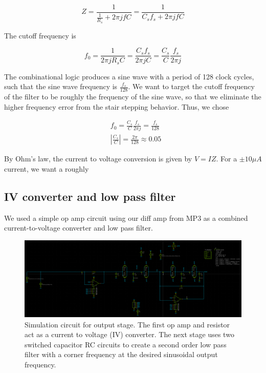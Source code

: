 \documentclass{article}
\begin{document}
\begin{equation}
    \label{eq:equivalent_impedance}
    Z = \frac{1}{\frac{1}{R_s} + 2 \pi j f C} = \frac{1}{C_s f_s + 2 \pi j f C}
\end{equation}

The cutoff frequency is 

\begin{equation}
    f_0 = \frac{1}{2 \pi j R_s C} = \frac{C_s f_s}{2 \pi j C} = \frac{C_s}{C} \frac{f_s}{2 \pi j}
\end{equation}

The combinational logic produces a sine wave with a period of 128 clock cycles, such that the sine wave frequency is $\frac{f_s}{128}$. We want to target the cutoff frequency of the filter to be roughly the frequency of the sine wave, so that we eliminate the higher frequency error from the stair stepping behavior. Thus, we chose

\begin{equation}
\begin{split}
    \label{eq:capacitor_speccing}
    & f_0 = \frac{C_s}{C} \frac{f_s}{2 \pi j} = \frac{f_s}{128} \\
    & |\frac{C_s}{C}| =\frac{2 \pi}{128} \approx 0.05
\end{split} 
\end{equation}

By Ohm's law, the current to voltage conversion is given by $V = IZ$. For a $\pm 10\mu A$ current, we want a roughly

\subsection{IV converter and low pass filter}
We used a simple op amp circuit using our diff amp from MP3 as a combined current-to-voltage converter and low pass filter. 


\begin{figure}[H]
    \centering{}
    \includegraphics[width=1.0\columnwidth]{images/switched_capacitor_circuit_3.png}
    \caption{Simulation circuit for output stage. The first op amp and resistor act as a current to voltage (IV) converter. The next stage uses two switched capacitor RC circuits to create a second order low pass filter with a corner frequency at the desired sinusoidal output frequency.}
    \label{fig:switched_capacitor_circuit}
\end{figure}
\end{document}
